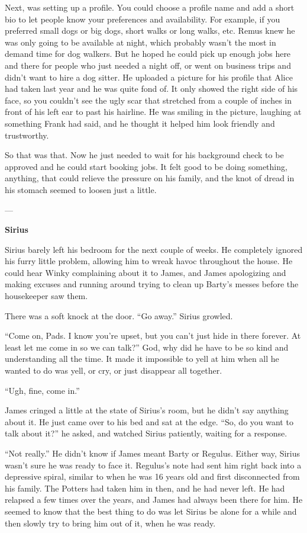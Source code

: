 \documentclass[12pt,twoside,openright]{memoir}
\begin{document}
Next, was setting up a profile. You could choose a profile name and add a short bio to let people know your preferences and availability. For example, if you preferred small dogs or big dogs, short walks or long walks, etc. Remus knew he was only going to be available at night, which probably wasn't the most in demand time for dog walkers. But he hoped he could pick up enough jobs here and there for people who just needed a night off, or went on business trips and didn't want to hire a dog sitter. He uploaded a picture for his profile that Alice had taken last year and he was quite fond of. It only showed the right side of his face, so you couldn't see the ugly scar that stretched from a couple of inches in front of his left ear to past his hairline. He was smiling in the picture, laughing at something Frank had said, and he thought it helped him look friendly and trustworthy. 

So that was that. Now he just needed to wait for his background check to be approved and he could start booking jobs. It felt good to be doing something, anything, that could relieve the pressure on his family, and the knot of dread in his stomach seemed to loosen just a little.

---

\textbf{Sirius} 

Sirius barely left his bedroom for the next couple of weeks. He completely ignored his furry little problem, allowing him to wreak havoc throughout the house. He could hear Winky complaining about it to James, and James apologizing and making excuses and running around trying to clean up Barty's messes before the housekeeper saw them.

There was a soft knock at the door. ``Go away.'' Sirius growled. 

``Come on, Pads. I know you're upset, but you can't just hide in there forever. At least let me come in so we can talk?''
God, why did he have to be so kind and understanding all the time. It made it impossible to yell at him when all he wanted to do was yell, or cry, or just disappear all together. 

``Ugh, fine, come in.''

James cringed a little at the state of Sirius's room, but he didn't say anything about it. He just came over to his bed and sat at the edge. ``So, do you want to talk about it?'' he asked, and watched Sirius patiently, waiting for a response.

``Not really.'' He didn't know if James meant Barty or Regulus. Either way, Sirius wasn't sure he was ready to face it. Regulus's note had sent him right back into a depressive spiral, similar to when he was 16 years old and first disconnected from his family. The Potters had taken him in then, and he had never left. He had relapsed a few times over the years, and James had always been there for him. He seemed to know that the best thing to do was let Sirius be alone for a while and then slowly try to bring him out of it, when he was ready. 
\end{document}
